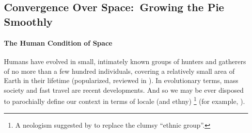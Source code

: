 



\subsection[Convergence Over Space]{Convergence Over Space:\ Growing the Pie Smoothly}
	\label{sec:space}

\paragraph{The Human Condition of Space}
Humans have evolved in small, intimately known groups of hunters and gatherers of no more than a few hundred individuals, covering a relatively small area of Earth in their lifetime (popularized, reviewed in \citealt{Diamond1997}).
In evolutionary terms, mass society and fast travel are recent developments.
And so we may be ever disposed to parochially define our context in terms of locale (and ethny)
\footnote{
	A neologism suggested by \citeauthor{Van-den-Berghe-1981-aa} to replace the clumsy ``ethnic group''.
}
(for example, \citealt{Van-den-Berghe-1981-aa}).

